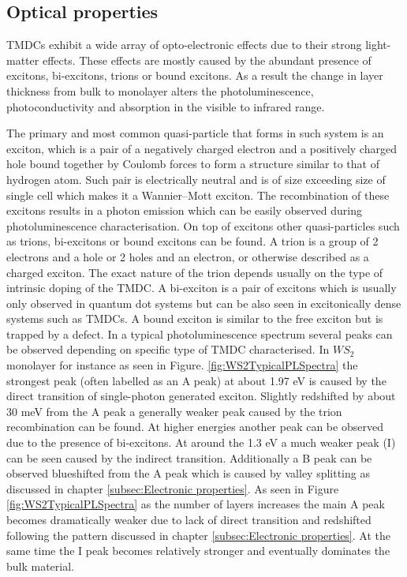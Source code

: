 	
	\subsection{Optical properties}
	\label{subsec:Optical properties}

	TMDCs exhibit a wide array of opto-electronic effects due to their strong light-matter effects. These effects are mostly caused by the abundant presence of excitons, bi-excitons, trions or bound excitons. As a result the change in layer thickness from bulk to monolayer alters the photoluminescence, photoconductivity and absorption in the visible to infrared range.
		
	The primary and most common quasi-particle that forms in such system is an exciton, which is a pair of a negatively charged electron and a positively charged hole bound together by Coulomb forces to form a structure similar to that of hydrogen atom. Such pair is electrically neutral and is of size exceeding size of single cell which makes it a Wannier–Mott exciton. The recombination of these excitons results in a photon emission which can be easily observed during photoluminescence characterisation. On top of excitons other quasi-particles such as trions, bi-excitons or bound excitons can be found. A trion is a group of 2 electrons and a hole or 2 holes and an electron, or otherwise described as a charged exciton. The exact nature of the trion depends usually on the type of intrinsic doping of the TMDC. A bi-exciton is a pair of excitons which is usually only observed in quantum dot systems but can be also seen in excitonically dense systems such as TMDCs. A bound exciton is similar to the free exciton but is trapped by a defect. In a typical photoluminescence spectrum several peaks can be observed depending on specific type of TMDC characterised. In $WS_2$ monolayer for instance as seen in Figure. \ref{fig:WS2TypicalPLSpectra} the strongest peak (often labelled as an A peak) at about 1.97 eV is caused by the direct transition of single-photon generated exciton. Slightly redshifted by about 30 meV from the A peak a generally weaker peak caused by the trion recombination can be found. At higher energies another peak can be observed due to the presence of bi-excitons. At around the 1.3 eV a much weaker peak (I) can be seen caused by the indirect transition. Additionally a B peak can be observed blueshifted from the A peak which is caused by valley splitting as discussed in chapter \ref{subsec:Electronic properties}. As seen in Figure \ref{fig:WS2TypicalPLSpectra} as the number of layers increases the main A peak becomes dramatically weaker due to lack of direct transition and redshifted following the pattern discussed in chapter \ref{subsec:Electronic properties}. At the same time the I peak becomes relatively stronger and eventually dominates the bulk material.
		

